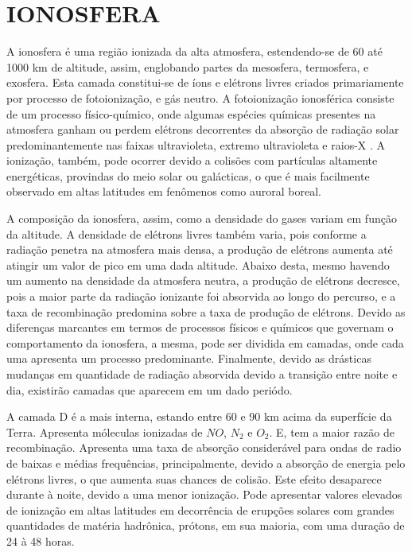 \chapter{IONOSFERA}

A ionosfera é uma região ionizada da alta atmosfera, estendendo-se de 60 até 1000 km de altitude, assim, englobando partes da mesosfera, termosfera, e exosfera. Esta camada constitui-se de íons e elétrons livres criados primariamente por processo de fotoionização, e gás neutro. A fotoionização ionosférica consiste de um processo físico-químico, onde algumas espécies químicas presentes na atmosfera ganham ou perdem elétrons decorrentes da absorção de radiação solar predominantemente nas faixas ultravioleta, extremo ultravioleta e raios-X \cite{RISNBETH:1969, NEGRETI:2012}. A ionização, também, pode ocorrer devido a colisões com partículas altamente energéticas, provindas do meio solar ou galácticas, o que é mais facilmente observado em altas latitudes em fenômenos como auroral boreal.

A composição da ionosfera, assim, como a densidade do gases variam em função da altitude. A densidade de elétrons livres também varia, pois conforme a radiação penetra na atmosfera mais densa, a produção de elétrons aumenta até atingir um valor de pico em uma dada altitude. Abaixo desta, mesmo havendo um aumento na densidade da atmosfera neutra, a produção de elétrons decresce, pois a maior parte da radiação ionizante foi absorvida ao longo do percurso, e a taxa de recombinação predomina sobre a taxa de produção de elétrons. Devido as diferenças marcantes em termos de processos físicos e químicos que governam o comportamento da ionosfera, a mesma, pode ser dividida em camadas, onde cada uma apresenta um processo predominante. Finalmente, devido as drásticas mudanças em quantidade de radiação absorvida devido a transição entre noite e dia, existirão camadas que aparecem em um dado periódo.

A camada D é a mais interna, estando entre 60 e 90 km acima da superfície da Terra. Apresenta móleculas ionizadas de $NO$, $N_2$ e $O_2$. E, tem a maior razão de recombinação. Apresenta uma taxa de absorção considerável para ondas de radio de baixas e médias frequências, principalmente, devido a absorção de energia pelo elétrons livres, o que aumenta suas chances de colisão. Este efeito desaparece durante à noite, devido a uma menor ionização. Pode apresentar valores elevados de ionização em altas latitudes em decorrência de erupções solares com grandes quantidades de matéria hadrônica, prótons, em sua maioria, com uma duração de 24 à 48 horas.

